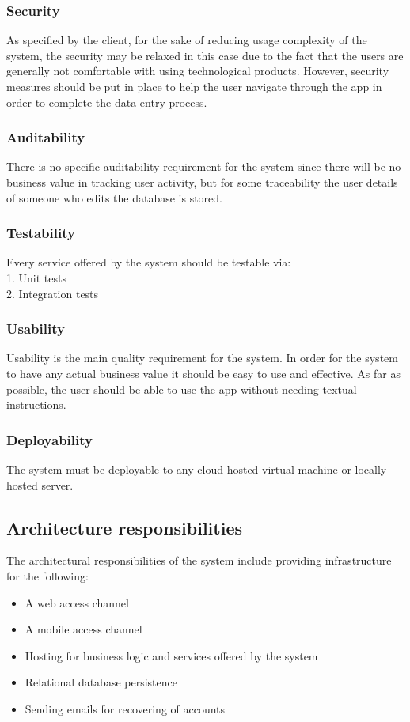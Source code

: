 \documentclass[11pt,a4paper,titlepage]{article}
\begin{document}
		\subsubsection{Security}
			As specified by the client, for the sake of reducing usage complexity of the system, the security may be relaxed in this case due to the fact that the users are generally not comfortable with using technological products. However, security measures should be put in place to help the user navigate through the app in order to complete the data entry process.
		\subsubsection{Auditability}
			There is no specific auditability requirement for the system since there will be no business value in tracking user activity, but for some traceability the user details of someone who edits the database is stored.
		\subsubsection{Testability}
			Every service offered by the system should be testable via:\\
			1. Unit tests\\
			2. Integration tests
		\subsubsection{Usability}
			Usability is the main quality requirement for the system. In order for the system to have any actual business value it should be easy to use and effective. As far as possible, the user should be able to use the app without needing textual instructions.
		\subsubsection{Deployability}
			The system must be deployable to any cloud hosted virtual machine or locally hosted server.
	\subsection{Architecture responsibilities}
	The architectural responsibilities of the system include providing infrastructure for the following:
		\begin{itemize}
			\item A web access channel
			\item A mobile access channel
			\item Hosting for business logic and services offered by the system
			\item Relational database persistence
			\item Sending emails for recovering of accounts
		\end{itemize}
\end{document}
